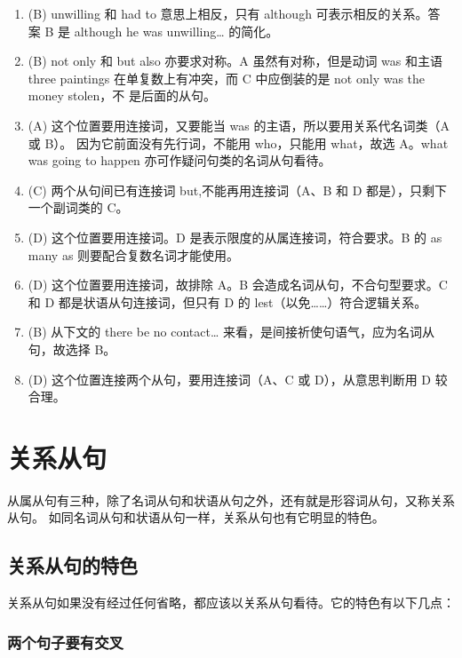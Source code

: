 \begin{enumerate}
\item (B) unwilling 和 had to 意思上相反，只有 although 可表示相反的关系。答
  案 B 是 although he was unwilling… 的简化。

\item (B) not only 和 but also 亦要求对称。A 虽然有对称，但是动词 was 和主语 three
  paintings 在单复数上有冲突，而 C 中应倒装的是 not only was the money stolen，不
  是后面的从句。


\item (A) 这个位置要用连接词，又要能当 was 的主语，所以要用关系代名词类（A 或 B）。
  因为它前面没有先行词，不能用 who，只能用 what，故选 A。what was going to
  happen 亦可作疑问句类的名词从句看待。

\item  (C) 两个从句间已有连接词 but,不能再用连接词（A、B 和 D 都是），只剩下一个副词类的 C。

\item (D) 这个位置要用连接词。D 是表示限度的从属连接词，符合要求。B 的 as many as 则要配合复数名词才能使用。
\item (D) 这个位置要用连接词，故排除 A。B 会造成名词从句，不合句型要求。C 和 D 都是状语从句连接词，但只有 D 的 lest（以免……）符合逻辑关系。
\item (B) 从下文的 there be no contact… 来看，是间接祈使句语气，应为名词从句，故选择 B。

\item (D) 这个位置连接两个从句，要用连接词（A、C 或 D），从意思判断用 D 较合理。
\end{enumerate}

\chapter{关系从句}

从属从句有三种，除了名词从句和状语从句之外，还有就是形容词从句，又称关系从句。
如同名词从句和状语从句一样，关系从句也有它明显的特色。

\section{关系从句的特色}

关系从句如果没有经过任何省略，都应该以关系从句看待。它的特色有以下几点：

\subsection{两个句子要有交叉}

